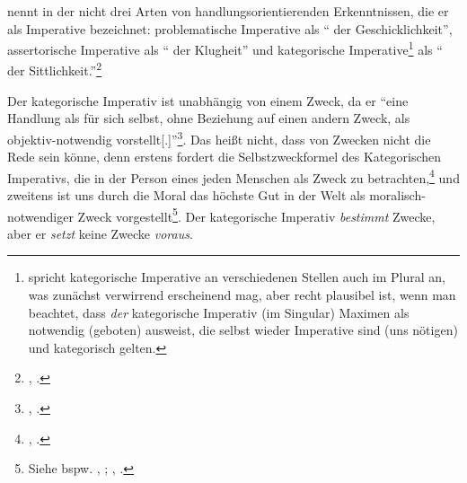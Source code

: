  nennt in der 
nicht drei Arten von handlungsorientierenden Erkenntnissen, die er als
Imperative bezeichnet: problematische Imperative als \enquote{ der
Geschicklichkeit}, assertorische Imperative als \enquote{ der Klugheit} und
kategorische Imperative\footnote{ spricht kategorische
Imperative an verschiedenen Stellen auch im Plural an, was zunächst verwirrend
erscheinend mag, aber recht plausibel ist, wenn man beachtet, dass \emph{der}
kategorische Imperativ (im Singular) Maximen als notwendig (geboten) ausweist,
die selbst wieder Imperative sind (uns nötigen) und kategorisch gelten.} als
\enquote{ der Sittlichkeit.}\footnote{\cite[][BA
40--43]{Kant:GrundlegungzurMetaphysikderSitten1965}, \cite[IV:
414.32--416.20]{Kant:GesammelteWerke1900ff.}.}

Der kategorische Imperativ ist unabhängig von einem Zweck, da er \enquote{eine
Handlung als für sich selbst, ohne Beziehung auf einen andern Zweck, als
objektiv-notwendig
vorstellt[.]}\footnote{\cite[][BA~39]{Kant:GrundlegungzurMetaphysikderSitten1965},
\cite[][IV: 414.16--17]{Kant:GesammelteWerke1900ff.}.}. Das heißt nicht, dass
von Zwecken nicht die Rede sein könne, denn erstens fordert die
Selbstzweckformel des Kategorischen Imperativs, die  in
der Person eines jeden Menschen als Zweck zu
betrachten,\footnote{\cite[Vgl.][BA~66f.]{Kant:GrundlegungzurMetaphysikderSitten1965},
\cite[][IV: 429.10--12]{Kant:GesammelteWerke1900ff.}.} und zweitens ist uns
durch die Moral das höchste Gut in der Welt als moralisch-notwendiger Zweck
vorgestellt\footnote{Siehe bspw. \cite[][B
842--847]{Kant:KritikderreinenVernunft2003}, \cite[][III:
528.13--531.23]{Kant:GesammelteWerke1900ff.};
\cite[][A 219--223]{Kant:KritikderpraktischenVernunft1974}, \cite[][V:
122.4--16]{Kant:GesammelteWerke1900ff.}.}.
Der kategorische Imperativ \emph{bestimmt} Zwecke, aber er \emph{setzt} keine Zwecke
\emph{voraus}.


